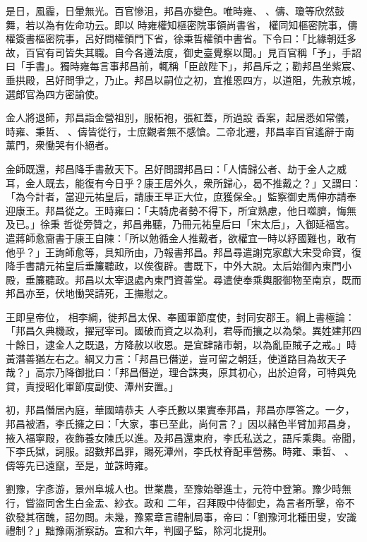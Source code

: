 \begin{pinyinscope}
 是日，風霾，日暈無光。百官慘沮，邦昌亦變色。唯時雍、𠦅、儔、瓊等欣然鼓舞，若以為有佐命功云。即以
 時雍權知樞密院事領尚書省，𠦅權同知樞密院事，儔權簽書樞密院事，呂好問權領門下省，徐秉哲權領中書省。下令曰：「比緣朝廷多故，百官有司皆失其職。自今各遵法度，御史臺覺察以聞。」見百官稱「予」，手詔曰「手書」。獨時雍每言事邦昌前，輒稱「臣啟陛下」，邦昌斥之；勸邦昌坐紫宸、垂拱殿，呂好問爭之，乃止。邦昌以嗣位之初，宜推恩四方，以道阻，先赦京城，選郎官為四方密諭使。



 金人將退師，邦昌詣金營祖別，服柘袍，張紅蓋，所過設
 香案，起居悉如常儀，時雍、秉哲、𠦅、儔皆從行，士庶觀者無不感愴。二帝北遷，邦昌率百官遙辭于南薰門，衆慟哭有仆絕者。



 金師既還，邦昌降手書赦天下。呂好問謂邦昌曰：「人情歸公者、劫于金人之威耳，金人既去，能復有今日乎？康王居外久，衆所歸心，曷不推戴之？」又謂曰：「為今計者，當迎元祐皇后，請康王早正大位，庶獲保全。」監察御史馬伸亦請奉迎康王。邦昌從之。王時雍曰：「夫騎虎者勢不得下，所宜熟慮，他日噬臍，悔無及已。」徐秉
 哲從旁贊之，邦昌弗聽，乃冊元祐皇后曰「宋太后」，入御延福宮。遣蔣師愈齎書于康王自陳：「所以勉循金人推戴者，欲權宜一時以紓國難也，敢有他乎？」王詢師愈等，具知所由，乃報書邦昌。邦昌尋遣謝克家獻大宋受命寶，復降手書請元祐皇后垂簾聽政，以俟復辟。書既下，中外大說。太后始御內東門小殿，垂簾聽政。邦昌以太宰退處內東門資善堂。尋遣使奉乘輿服御物至南京，既而邦昌亦至，伏地慟哭請死，王撫慰之。



 王即皇帝位，
 相李綱，徙邦昌太保、奉國軍節度使，封同安郡王。綱上書極論：「邦昌久典機政，擢冠宰司。國破而資之以為利，君辱而攘之以為榮。異姓建邦四十餘日，逮金人之既退，方降赦以收恩。是宜肆諸市朝，以為亂臣賊子之戒。」時黃潛善猶左右之。綱又力言：「邦昌已僭逆，豈可留之朝廷，使道路目為故天子哉？」高宗乃降御批曰：「邦昌僭逆，理合誅夷，原其初心，出於迫脅，可特與免貸，責授昭化軍節度副使、潭州安置。」



 初，邦昌僭居內庭，華國靖恭夫
 人李氏數以果實奉邦昌，邦昌亦厚答之。一夕，邦昌被酒，李氏擁之曰：「大家，事已至此，尚何言？」因以赭色半臂加邦昌身，掖入福寧殿，夜飾養女陳氏以進。及邦昌還東府，李氏私送之，語斥乘輿。帝聞，下李氏獄，詞服。詔數邦昌罪，賜死潭州，李氏杖脊配車營務。時雍、秉哲、𠦅、儔等先已遠竄，至是，並誅時雍。



 劉豫，字彥游，景州阜城人也。世業農，至豫始舉進士，元符中登第。豫少時無行，嘗盜同舍生白金盂、紗衣。政和
 二年，召拜殿中侍御史，為言者所擊，帝不欲發其宿醜，詔勿問。未幾，豫累章言禮制局事，帝曰：「劉豫河北種田叟，安識禮制？」黜豫兩浙察訪。宣和六年，判國子監，除河北提刑。




\end{pinyinscope}
